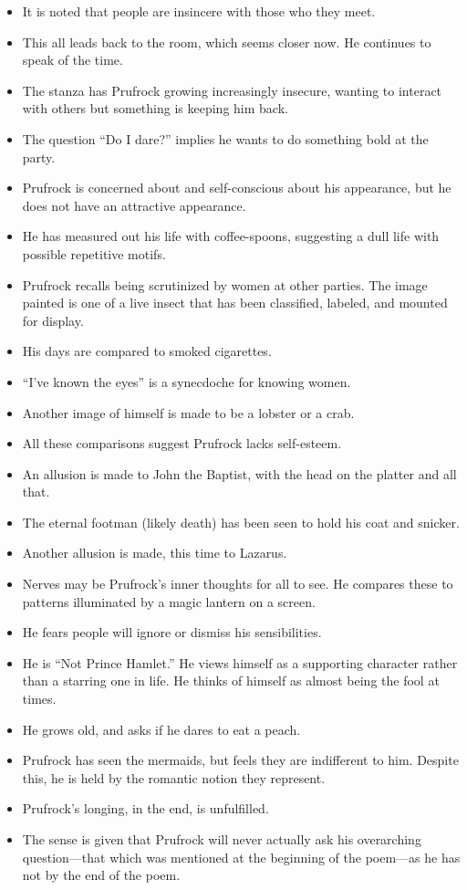 \documentclass[11pt]{article}
\begin{document}
\begin{itemize}
	\item It is noted that people are insincere with those who they meet.
	\item This all leads back to the room, which seems closer now.  He continues 
		to speak of the time.
	\item The stanza has Prufrock growing increasingly insecure, wanting to 
		interact with others but something is keeping him back.
	\item The question ``Do I dare?'' implies he wants to do something bold at the
		party.
	\item Prufrock is concerned about and self-conscious about his appearance, but
		he does not have an attractive appearance.
	\item He has measured out his life with coffee-spoons, suggesting a dull life
		with possible repetitive motifs.  
	\item Prufrock recalls being scrutinized by women at other parties.  The image
		painted is one of a live insect that has been classified, labeled, and 
		mounted for display.
	\item His days are compared to smoked cigarettes.
	\item ``I've known the eyes'' is a synecdoche for knowing women.
	\item Another image of himself is made to be a lobster or a crab.
	\item All these comparisons suggest Prufrock lacks self-esteem.
	\item An allusion is made to John the Baptist, with the head on the platter
		and all that.  
	\item The eternal footman (likely death) has been seen to hold his coat and 
		snicker.
	\item Another allusion is made, this time to Lazarus.
	\item Nerves may be Prufrock's inner thoughts for all to see.  He compares
		these to patterns illuminated by a magic lantern on a screen.
	\item He fears people will ignore or dismiss his sensibilities.
	\item He is ``Not Prince Hamlet.'' He views himself as a supporting character
		rather than a starring one in life.  He thinks of himself as almost being
		the fool at times.
	\item He grows old, and asks if he dares to eat a peach.
	\item Prufrock has seen the mermaids, but feels they are indifferent to him.
		Despite this, he is held by the romantic notion they represent.
	\item Prufrock's longing, in the end, is unfulfilled.
	\item The sense is given that Prufrock will never actually ask his overarching
		question---that which was mentioned at the beginning of the poem---as he has
		not by the end of the poem.
\end{itemize}
\end{document}
